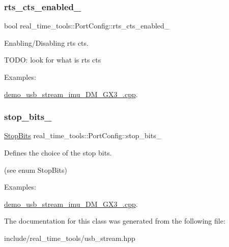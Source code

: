 \subsubsection{\texorpdfstring{rts\+\_\+cts\+\_\+enabled\+\_\+}{rts\_cts\_enabled\_}}
{\footnotesize\ttfamily bool real\+\_\+time\+\_\+tools\+::\+Port\+Config\+::rts\+\_\+cts\+\_\+enabled\+\_\+}



Enabling/\+Disabling rts cts. 

T\+O\+DO\+: look for what is rts cts \begin{Desc}
\item[Examples\+: ]\par
\hyperlink{demo_usb_stream_imu_3DM_GX3_25_8cpp-example}{demo\+\_\+usb\+\_\+stream\+\_\+imu\+\_\+D\+M\+\_\+\+G\+X3\+\_.\+cpp}.\end{Desc}
\mbox{\label{classreal__time__tools_1_1PortConfig_a3303d793237edbfa0b3c28f3f01c3837}} 
\subsubsection{\texorpdfstring{stop\+\_\+bits\+\_\+}{stop\_bits\_}}
{\footnotesize\ttfamily \hyperlink{classreal__time__tools_1_1PortConfig_a62bbab15705e2d5a9bc17115222f7c07}{Stop\+Bits} real\+\_\+time\+\_\+tools\+::\+Port\+Config\+::stop\+\_\+bits\+\_\+}



Defines the choice of the stop bits. 

(see enum Stop\+Bits) \begin{Desc}
\item[Examples\+: ]\par
\hyperlink{demo_usb_stream_imu_3DM_GX3_25_8cpp-example}{demo\+\_\+usb\+\_\+stream\+\_\+imu\+\_\+D\+M\+\_\+\+G\+X3\+\_.\+cpp}.\end{Desc}


The documentation for this class was generated from the following file\+:\begin{DoxyCompactItemize}
\item 
include/real\+\_\+time\+\_\+tools/usb\+\_\+stream.\+hpp\end{DoxyCompactItemize}
